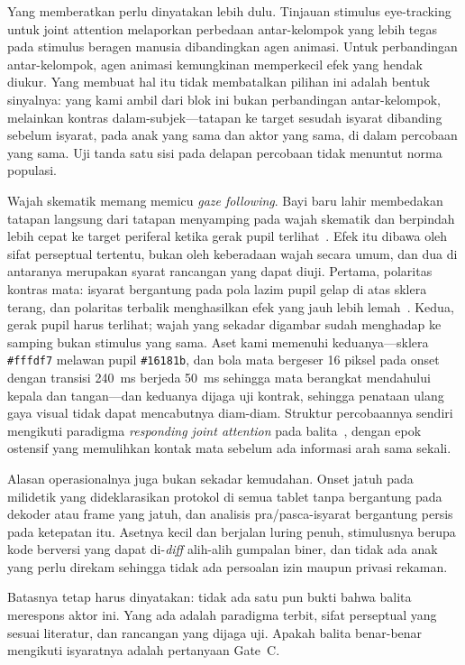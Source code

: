 \documentclass{article}
\begin{document}
Yang memberatkan perlu dinyatakan lebih dulu. Tinjauan stimulus eye-tracking untuk joint
attention melaporkan perbedaan antar-kelompok yang lebih tegas pada stimulus beragen
manusia dibandingkan agen animasi. Untuk perbandingan antar-kelompok, agen animasi
kemungkinan memperkecil efek yang hendak diukur. Yang membuat hal itu tidak membatalkan
pilihan ini adalah bentuk sinyalnya: yang kami ambil dari blok ini bukan perbandingan
antar-kelompok, melainkan kontras dalam-subjek---tatapan ke target sesudah isyarat
dibanding sebelum isyarat, pada anak yang sama dan aktor yang sama, di dalam percobaan
yang sama. Uji tanda satu sisi pada delapan percobaan tidak menuntut norma populasi.

Wajah skematik memang memicu \emph{gaze following}. Bayi baru lahir membedakan tatapan
langsung dari tatapan menyamping pada wajah skematik dan berpindah lebih cepat ke target
periferal ketika gerak pupil terlihat~\cite{farroni2004}. Efek itu dibawa oleh sifat
perseptual tertentu, bukan oleh keberadaan wajah secara umum, dan dua di antaranya
merupakan syarat rancangan yang dapat diuji. Pertama, polaritas kontras mata: isyarat
bergantung pada pola lazim pupil gelap di atas sklera terang, dan polaritas terbalik
menghasilkan efek yang jauh lebih lemah~\cite{gredeback2018}. Kedua, gerak pupil harus
terlihat; wajah yang sekadar digambar sudah menghadap ke samping bukan stimulus yang
sama. Aset kami memenuhi keduanya---sklera \texttt{\#fffdf7} melawan pupil
\texttt{\#16181b}, dan bola mata bergeser 16 piksel pada onset dengan transisi 240~ms
berjeda 50~ms sehingga mata berangkat mendahului kepala dan tangan---dan keduanya dijaga
uji kontrak, sehingga penataan ulang gaya visual tidak dapat mencabutnya diam-diam.
Struktur percobaannya sendiri mengikuti paradigma \emph{responding joint attention} pada
balita~\cite{billeci2019}, dengan epok ostensif yang memulihkan kontak mata sebelum ada
informasi arah sama sekali.

Alasan operasionalnya juga bukan sekadar kemudahan. Onset jatuh pada milidetik yang
dideklarasikan protokol di semua tablet tanpa bergantung pada dekoder atau frame yang
jatuh, dan analisis pra/pasca-isyarat bergantung persis pada ketepatan itu. Asetnya kecil
dan berjalan luring penuh, stimulusnya berupa kode berversi yang dapat di-\emph{diff}
alih-alih gumpalan biner, dan tidak ada anak yang perlu direkam sehingga tidak ada
persoalan izin maupun privasi rekaman.

Batasnya tetap harus dinyatakan: tidak ada satu pun bukti bahwa balita merespons aktor
ini. Yang ada adalah paradigma terbit, sifat perseptual yang sesuai literatur, dan
rancangan yang dijaga uji. Apakah balita benar-benar mengikuti isyaratnya adalah
pertanyaan Gate~C.
\end{document}
